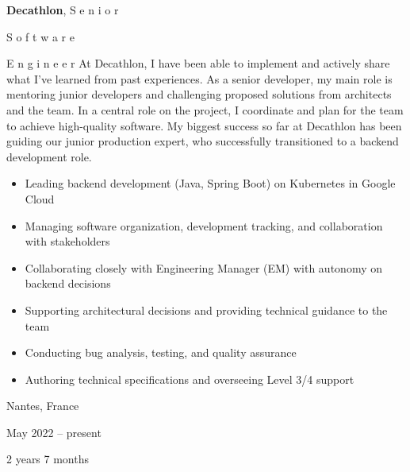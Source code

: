 \documentclass[10pt, letterpaper]{article}
\newenvironment{highlights}{
    \begin{itemize}[
        topsep=0.10 cm,
        parsep=0.10 cm,
        partopsep=0pt,
        itemsep=0pt,
        leftmargin=0.4 cm + 10pt
    ]
}{
    \end{itemize}
} %
\newenvironment{twocolentry}[2][]{
    \onecolentry
    \def\secondColumn{#2}
    \setcolumnwidth{\fill, 4.5 cm}
    \begin{paracol}{2}
}{
    \switchcolumn \raggedleft \secondColumn
    \end{paracol}
    \endonecolentry
} %
\begin{document}
        
        \begin{twocolentry}{
            Nantes, France

        May 2022 – present

        2 years 7 months
        }
            \textbf{Decathlon}, S
        e
        n
        i
        o
        r
         
        S
        o
        f
        t
        w
        a
        r
        e
         
        E
        n
        g
        i
        n
        e
        e
        r 
            At Decathlon, I have been able to implement and actively share what I’ve learned from past experiences. As a senior developer, my main role is mentoring junior developers and challenging proposed solutions from architects and the team. In a central role on the project, I coordinate and plan for the team to achieve high-quality software. My biggest success so far at Decathlon has been guiding our junior production expert, who successfully transitioned to a backend development role.
            \begin{highlights}
                \item Leading backend development (Java, Spring Boot) on Kubernetes in Google Cloud
                \item Managing software organization, development tracking, and collaboration with stakeholders
                \item Collaborating closely with Engineering Manager (EM) with autonomy on backend decisions
                \item Supporting architectural decisions and providing technical guidance to the team
                \item Conducting bug analysis, testing, and quality assurance
                \item Authoring technical specifications and overseeing Level 3/4 support
            \end{highlights}
        \end{twocolentry}


        \vspace{0.2 cm}
\end{document}

